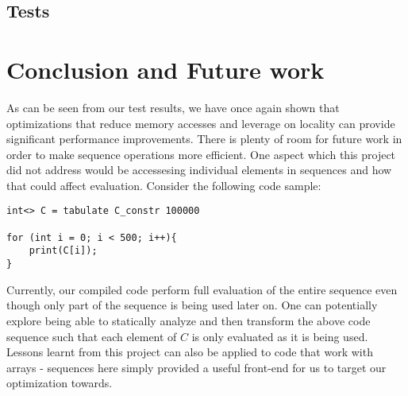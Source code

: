\documentclass[a4paper,twocolumn]{article}
\begin{document}
\subsection{Tests}

\section{Conclusion and Future work}
As can be seen from our test results, we have once again shown that
optimizations that reduce memory accesses and leverage on locality can provide
significant performance improvements. There is plenty of room for future work
in order to make sequence operations more efficient. One aspect which this
project did not address would be accessesing individual elements in sequences
and how that could affect evaluation. Consider the following code sample:
\begin{verbatim}
int<> C = tabulate C_constr 100000

for (int i = 0; i < 500; i++){
    print(C[i]);
}
\end{verbatim}
Currently, our compiled code perform full evaluation of the entire sequence
even though only part of the sequence is being used later on. One can
potentially explore being able to statically analyze and then transform the
above code sequence such that each element of $C$ is only evaluated as it is
being used. Lessons learnt from this project can also be applied to code that
work with arrays - sequences here simply provided a useful front-end for us to
target our optimization towards.
\end{document}

